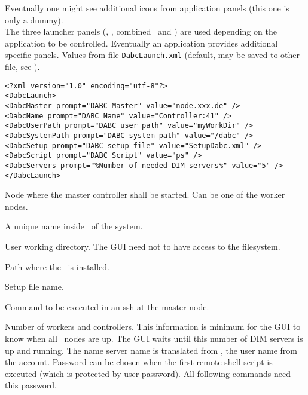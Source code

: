  Eventually one might see additional icons from application panels
(this one is only a dummy).\\
The three launcher panels (\dabc, \mbs, combined \dabc\ and \mbs) 
are used depending on the
application to be controlled. Eventually an application provides 
additional specific panels.
Values from file {\tt DabcLaunch.xml} (default, may be saved to other file,
see ).
{\small \begin{verbatim}
<?xml version="1.0" encoding="utf-8"?>
<DabcLaunch>
<DabcMaster prompt="DABC Master" value="node.xxx.de" />
<DabcName prompt="DABC Name" value="Controller:41" />
<DabcUserPath prompt="DABC user path" value="myWorkDir" />
<DabcSystemPath prompt="DABC system path" value="/dabc" />
<DabcSetup prompt="DABC setup file" value="SetupDabc.xml" />
<DabcScript prompt="DABC Script" value="ps" />
<DabcServers prompt="%Number of needed DIM servers%" value="5" />
</DabcLaunch>
\end{verbatim}
\bdes
\item[DabcMaster:] Node where the master controller shall be started.
Can be one of the worker nodes.
\item[DabcName:] A unique name inside \dabc\ of the system.
\item[DabcUserPath:] User working directory. The GUI need not to have
access to the filesystem. 
\item[DabcSystemPath:] Path where the \dabc\ is installed.
\item[DabcSetup:] Setup file name.
\item[DabcScript:] Command to be executed in an ssh at the master node.
\item[DabcServers:] Number of workers and controllers. This information
is minimum for the GUI to know when all \dabc\ nodes are up. The GUI waits until
this number of DIM servers is up and running.
\edes
The name server name is translated from ,
the user name from the account. Password can be chosen when
the first remote shell script is executed (which is protected by
user password). All following commands need this password.
}
